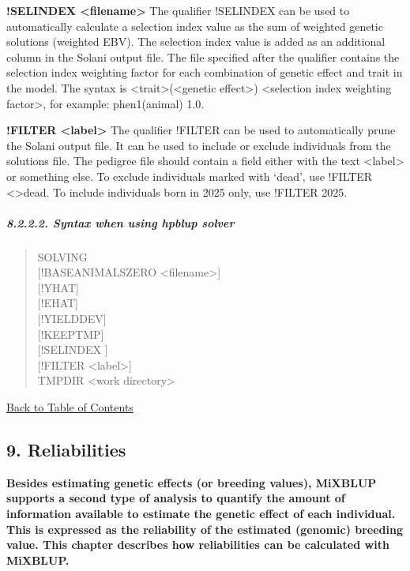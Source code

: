 \textbf{!SELINDEX \textless filename\textgreater{}} The qualifier
!SELINDEX can be used to automatically calculate a selection index value
as the sum of weighted genetic solutions (weighted EBV). The selection
index value is added as an additional column in the Solani output file.
The file specified after the qualifier contains the selection index
weighting factor for each combination of genetic effect and trait in the
model. The syntax is \textless trait\textgreater(\textless genetic
effect\textgreater) \textless selection index weighting
factor\textgreater, for example: phen1(animal) 1.0.

\textbf{!FILTER \textless label\textgreater{}} The qualifier !FILTER can
be used to automatically prune the Solani output file. It can be used to
include or exclude individuals from the solutions file. The pedigree
file should contain a field either with the text
\textless label\textgreater{} or something else. To exclude individuals
marked with `dead', use !FILTER \textless\textgreater dead. To include
individuals born in 2025 only, use !FILTER 2025.

\subparagraph{8.2.2.2. Syntax when using hpblup solver}\label{Cont11}

\begin{quote}
SOLVING\\
{[}!BASEANIMALSZERO \textless filename\textgreater{]}\\
{[}!YHAT{]}\\
{[}!EHAT{]}\\
{[}!YIELDDEV{]}\\
{[}!KEEPTMP{]}\\
{[}!SELINDEX {]}\\
{[}!FILTER \textless label\textgreater{]}\\
TMPDIR \textless work directory\textgreater{}
\end{quote}

\hyperref[Tabl01]{Back to Table of Contents}

\newpage

\subsection{9. Reliabilities}\label{Reli01}

\textbf{Besides estimating genetic effects (or breeding values), MiXBLUP
supports a second type of analysis to quantify the amount of information
available to estimate the genetic effect of each individual. This is
expressed as the reliability of the estimated (genomic) breeding value.
This chapter describes how reliabilities can be calculated with
MiXBLUP.}


